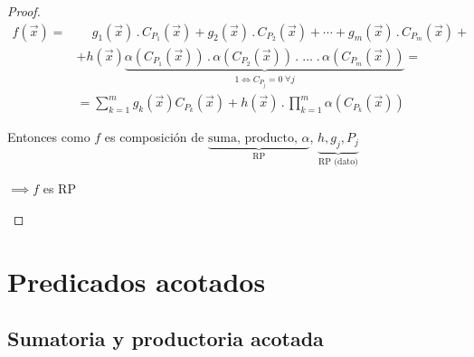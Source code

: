 \begin{proof} \phantom{.}

    \begin{align*}
        f(\overrightarrow{x}) =& \phantom{+}
        g_1(\overrightarrow{x}) \, . \, C_{P_1} (\overrightarrow{x}) +
        g_2(\overrightarrow{x}) \, . \, C_{P_2} (\overrightarrow{x}) +
        \cdots
        +
        g_m(\overrightarrow{x}) \, . \, C_{P_m} (\overrightarrow{x}) +\\
        &+ h(\overrightarrow{x}) 
        \underbrace{\alpha(C_{P_1}(\overrightarrow{x})) \, . \, 
        \alpha(C_{P_2}(\overrightarrow{x}))
        \, . \; 
        \dotsc
        \; . \, 
        \alpha (C_{P_m}(\overrightarrow{x}))}_{1 \iff C_{P_j}=0 \; \forall j} 
        = \\
        &= \sum_{k=1}^{m} g_{k}(\overrightarrow{x}) C_{P_k}(\overrightarrow{x})
        + h(\overrightarrow{x}) \, . \, \prod_{k=1}^{m} 
        \alpha(C_{P_k}(\overrightarrow{x}))
    \end{align*}

    Entonces como $f$ es composición de 
    $\underbrace{\text{suma, producto, } \alpha}_{\text{RP}}$,
    $\underbrace{h, g_j, P_j}_{\text{RP (dato)}}$

    \begin{center}
        $\implies f$ es RP
    \end{center}
\end{proof}

\section{Predicados acotados}

\subsection{Sumatoria y productoria acotada}

